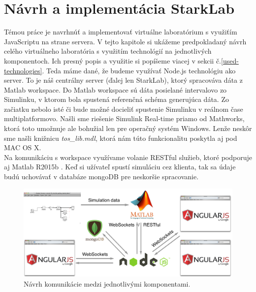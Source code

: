\section{Návrh a implementácia StarkLab}
\indent Témou práce je navrhnúť a implementovať virtuálne laboratórium s využiťím JavaScriptu na strane servera. V tejto kapitole si ukážeme predpokladaný návrh celého virtuálneho laboratória s využitím technológií na jednotlivých komponentoch. Ich presný popis a využitie si popíšeme viacej v sekcii č.\ref{used-technologies}. Teda máme dané, že budeme využívať Node.js technológiu ako server. To je náš centrálny server (ďalej len StarkLab), ktorý spracováva dáta z Matlab workspace. Do Matlab workspace sú dáta posielané intervalovo zo Simulinku, v ktorom bola spustená referenčná schéma generujúca dáta. Zo začiatku nebolo isté či bude možné docieliť spustenie Simulinku v reálnom čase multiplatformovo. Našli sme riešenie Simulink Real-time priamo od Mathworks, ktorá toto umožnuje ale bohužial len pre operačný systém Windows. Lenže neskôr sme našli knižnicu \textit{tos\_lib.mdl}, ktorá nám túto funkcionalitu poskytla aj pod MAC OS X.\\
Na komunikáciu s workspace využívame volanie RESTful služieb, ktoré podporuje aj Matlab R2015b \cite{matlab-restful}. Keď si užívateľ spustí simuláciu cez klienta, tak sa údaje budú uchovávať v databáze mongoDB pre neskoršie spracovanie.

\begin{figure}[H]
  \centering
  \includegraphics[scale=0.4]{img/software-design.png}
  \caption{Návrh komunikácie medzi jednotlivými komponentami.}
  \label{img-software-designl}
\end{figure}

